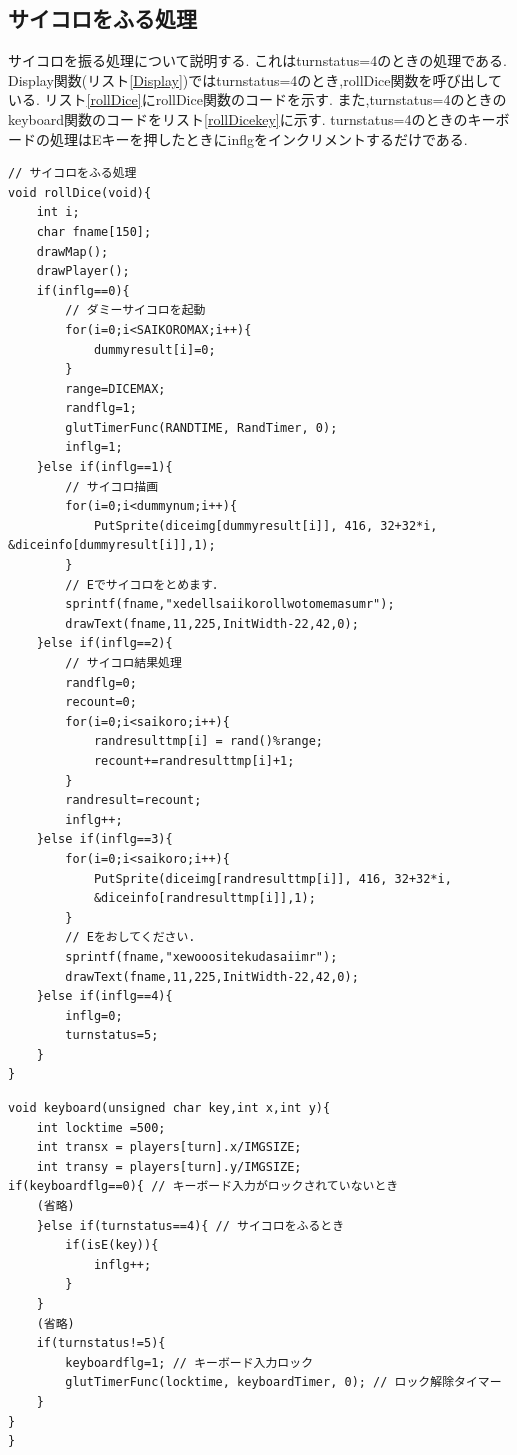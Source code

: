\documentclass[a4j]{jarticle}
\begin{document}
    \subsection{サイコロをふる処理}
    サイコロを振る処理について説明する. これはturnstatus=4のときの処理である.
    Display関数(リスト\ref{Display})ではturnstatus=4のとき,rollDice関数を呼び出している.
    リスト\ref{rollDice}にrollDice関数のコードを示す. また,turnstatus=4のときのkeyboard関数のコードをリスト\ref{rollDicekey}に示す.
    turnstatus=4のときのキーボードの処理はEキーを押したときにinflgをインクリメントするだけである.
        \begin{lstlisting}[basicstyle=\ttfamily\footnotesize, frame=single,label=rollDice,caption=rollDice関数]
// サイコロをふる処理
void rollDice(void){
    int i;
    char fname[150];
    drawMap();
    drawPlayer();    
    if(inflg==0){
        // ダミーサイコロを起動
        for(i=0;i<SAIKOROMAX;i++){
            dummyresult[i]=0;
        }
        range=DICEMAX;
        randflg=1;
        glutTimerFunc(RANDTIME, RandTimer, 0);
        inflg=1;
    }else if(inflg==1){
        // サイコロ描画
        for(i=0;i<dummynum;i++){
            PutSprite(diceimg[dummyresult[i]], 416, 32+32*i, &diceinfo[dummyresult[i]],1);
        }
        // Eでサイコロをとめます．
        sprintf(fname,"xedellsaiikorollwotomemasumr");
        drawText(fname,11,225,InitWidth-22,42,0);   
    }else if(inflg==2){
        // サイコロ結果処理
        randflg=0;
        recount=0;
        for(i=0;i<saikoro;i++){
            randresulttmp[i] = rand()%range;
            recount+=randresulttmp[i]+1;
        }
        randresult=recount;
        inflg++;
    }else if(inflg==3){
        for(i=0;i<saikoro;i++){
            PutSprite(diceimg[randresulttmp[i]], 416, 32+32*i, 
            &diceinfo[randresulttmp[i]],1);
        }       
        // Eをおしてください.
        sprintf(fname,"xewooositekudasaiimr");
        drawText(fname,11,225,InitWidth-22,42,0);
    }else if(inflg==4){
        inflg=0;
        turnstatus=5;
    }
}
        \end{lstlisting}

        \begin{lstlisting}[basicstyle=\ttfamily\footnotesize, frame=single,label=rollDicekey,caption=サイコロを振るときのキーボードの処理]
void keyboard(unsigned char key,int x,int y){
    int locktime =500;
    int transx = players[turn].x/IMGSIZE;
    int transy = players[turn].y/IMGSIZE;
if(keyboardflg==0){ // キーボード入力がロックされていないとき
    (省略)    
    }else if(turnstatus==4){ // サイコロをふるとき
        if(isE(key)){
            inflg++;
        }
    }
    (省略)
    if(turnstatus!=5){
        keyboardflg=1; // キーボード入力ロック
        glutTimerFunc(locktime, keyboardTimer, 0); // ロック解除タイマー
    }
}   
}    
        \end{lstlisting}
\end{document}
